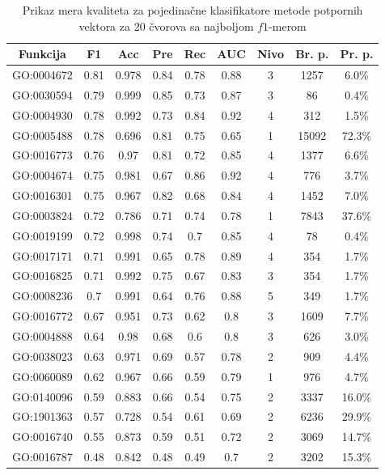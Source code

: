 \begin{table}[h]
	\centering
	\begin{tabular}{|c|c|c|c|c|c|c|c|c|}
		\hline
		Funkcija & F1 & Acc & Pre & Rec & AUC & Nivo & Br. p. & Pr. p. \\
		\hline
		GO:0004672 & 0.81 & 0.978 & 0.84 & 0.78 & 0.88 & 3 & 1257 & 6.0\% \\
		\hline
		GO:0030594 & 0.79 & 0.999 & 0.85 & 0.73 & 0.87 & 3 & 86 & 0.4\% \\
		\hline
		GO:0004930 & 0.78 & 0.992 & 0.73 & 0.84 & 0.92 & 4 & 312 & 1.5\% \\
		\hline
		GO:0005488 & 0.78 & 0.696 & 0.81 & 0.75 & 0.65 & 1 & 15092 & 72.3\% \\
		\hline
		GO:0016773 & 0.76 & 0.97 & 0.81 & 0.72 & 0.85 & 4 & 1377 & 6.6\% \\
		\hline
		GO:0004674 & 0.75 & 0.981 & 0.67 & 0.86 & 0.92 & 4 & 776 & 3.7\% \\
		\hline
		GO:0016301 & 0.75 & 0.967 & 0.82 & 0.68 & 0.84 & 4 & 1452 & 7.0\% \\
		\hline
		GO:0003824 & 0.72 & 0.786 & 0.71 & 0.74 & 0.78 & 1 & 7843 & 37.6\% \\
		\hline
		GO:0019199 & 0.72 & 0.998 & 0.74 & 0.7 & 0.85 & 4 & 78 & 0.4\% \\
		\hline
		GO:0017171 & 0.71 & 0.991 & 0.65 & 0.78 & 0.89 & 4 & 354 & 1.7\% \\
		\hline
		GO:0016825 & 0.71 & 0.992 & 0.75 & 0.67 & 0.83 & 3 & 354 & 1.7\% \\
		\hline
		GO:0008236 & 0.7 & 0.991 & 0.64 & 0.76 & 0.88 & 5 & 349 & 1.7\% \\
		\hline
		GO:0016772 & 0.67 & 0.951 & 0.73 & 0.62 & 0.8 & 3 & 1609 & 7.7\% \\
		\hline
		GO:0004888 & 0.64 & 0.98 & 0.68 & 0.6 & 0.8 & 3 & 626 & 3.0\% \\
		\hline
		GO:0038023 & 0.63 & 0.971 & 0.69 & 0.57 & 0.78 & 2 & 909 & 4.4\% \\
		\hline
		GO:0060089 & 0.62 & 0.967 & 0.66 & 0.59 & 0.79 & 1 & 976 & 4.7\% \\
		\hline
		GO:0140096 & 0.59 & 0.883 & 0.66 & 0.54 & 0.75 & 2 & 3337 & 16.0\% \\
		\hline
		GO:1901363 & 0.57 & 0.728 & 0.54 & 0.61 & 0.69 & 2 & 6236 & 29.9\% \\
		\hline
		GO:0016740 & 0.55 & 0.873 & 0.59 & 0.51 & 0.72 & 2 & 3069 & 14.7\% \\
		\hline
		GO:0016787 & 0.48 & 0.842 & 0.48 & 0.49 & 0.7 & 2 & 3202 & 15.3\% \\
		\hline
	\end{tabular}
	\caption{Prikaz mera kvaliteta za pojedina\v cne klasifikatore metode potpornih vektora za 20 \v cvorova sa najboljom $f1$-merom}
	\label{tab: svmF1}
\end{table}


